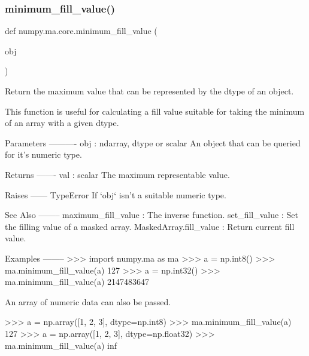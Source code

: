 \mbox{\label{namespacenumpy_1_1ma_1_1core_a16432d0ca3937ea84a89c8ff2544af3f}} 
\subsubsection{\texorpdfstring{minimum\+\_\+fill\+\_\+value()}{minimum\_fill\_value()}}
{\footnotesize\ttfamily def numpy.\+ma.\+core.\+minimum\+\_\+fill\+\_\+value (\begin{DoxyParamCaption}\item[{}]{obj }\end{DoxyParamCaption})}

\begin{DoxyVerb}Return the maximum value that can be represented by the dtype of an object.

This function is useful for calculating a fill value suitable for
taking the minimum of an array with a given dtype.

Parameters
----------
obj : ndarray, dtype or scalar
    An object that can be queried for it's numeric type.

Returns
-------
val : scalar
    The maximum representable value.

Raises
------
TypeError
    If `obj` isn't a suitable numeric type.

See Also
--------
maximum_fill_value : The inverse function.
set_fill_value : Set the filling value of a masked array.
MaskedArray.fill_value : Return current fill value.

Examples
--------
>>> import numpy.ma as ma
>>> a = np.int8()
>>> ma.minimum_fill_value(a)
127
>>> a = np.int32()
>>> ma.minimum_fill_value(a)
2147483647

An array of numeric data can also be passed.

>>> a = np.array([1, 2, 3], dtype=np.int8)
>>> ma.minimum_fill_value(a)
127
>>> a = np.array([1, 2, 3], dtype=np.float32)
>>> ma.minimum_fill_value(a)
inf\end{DoxyVerb}
 \mbox{\label{namespacenumpy_1_1ma_1_1core_a75b64c8b180060696d536301a4d3532d}} 
